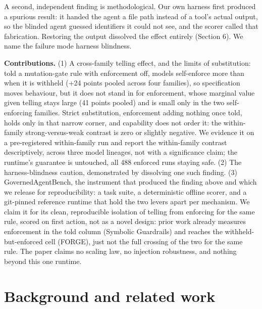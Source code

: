 \documentclass{article}
\begin{document}
A second, independent finding is methodological. Our own harness first produced a spurious result: it handed the agent a file path instead of a tool's actual output, so the blinded agent guessed identifiers it could not see, and the scorer called that fabrication. Restoring the output dissolved the effect entirely (Section 6). We name the failure mode harness blindness.

\textbf{Contributions.} (1) A cross-family telling effect, and the limits of substitution: told a mutation-gate rule with enforcement off, models self-enforce more than when it is withheld (+24 points pooled across four families), so specification moves behaviour, but it does not stand in for enforcement, whose marginal value given telling stays large (41 points pooled) and is small only in the two self-enforcing families. Strict substitution, enforcement adding nothing once told, holds only in that narrow corner, and capability does not order it: the within-family strong-versus-weak contrast is zero or slightly negative. We evidence it on a pre-registered within-family run and report the within-family contrast descriptively, across three model lineages, not with a significance claim; the runtime's guarantee is untouched, all 488 enforced runs staying safe. (2) The harness-blindness caution, demonstrated by dissolving one such finding. (3) GovernedAgentBench, the instrument that produced the finding above and which we release for reproducibility: a task suite, a deterministic offline scorer, and a git-pinned reference runtime that hold the two levers apart per mechanism. We claim it for its clean, reproducible isolation of telling from enforcing for the same rule, scored on first action, not as a novel design: prior work already measures enforcement in the told column (Symbolic Guardrails) and reaches the withheld-but-enforced cell (FORGE), just not the full crossing of the two for the same rule. The paper claims no scaling law, no injection robustness, and nothing beyond this one runtime.

\section{Background and related work}\label{background-and-related-work}
\end{document}

